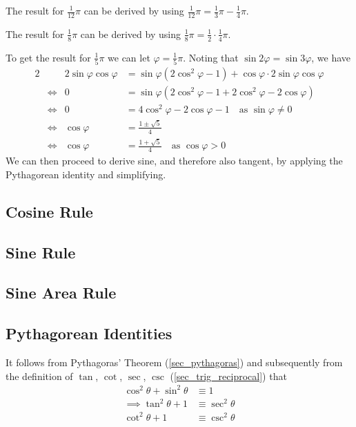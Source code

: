 The result for \(\frac 1{12} \pi\) can be derived by using
\(\frac 1{12} \pi = \frac 13 \pi - \frac 14 \pi\).

The result for \(\frac 18 \pi\) can be derived by using
\(\frac 18 \pi = \frac 12 \cdot \frac 14 \pi\).

To get the result for \(\frac 15 \pi\) we can let
\(\varphi = \frac 15 \pi\).  Noting that
\(\sin 2\varphi = \sin 3\varphi\), we have
\begin{alignat*}2
    && 2\sin \varphi \cos \varphi
        &= \sin \varphi (2\cos^2 \varphi - 1)
        + \cos \varphi \cdot 2\sin \varphi \cos \varphi \\
    &\iff{}& 0 &= \sin \varphi (2\cos^2 \varphi - 1
                            + 2\cos^2 \varphi - 2\cos \varphi) \\
    &\iff{}& 0 &= 4\cos^2 \varphi - 2\cos \varphi - 1
        \quad \text{as \(\sin \varphi \ne 0\)} \\
    &\iff{}& \cos \varphi &= \frac{1 \pm \sqrt 5} 4 \\
    &\iff{}& \cos \varphi &= \frac{1 + \sqrt 5} 4
        \quad \text{as \(\cos \varphi > 0\)}
\end{alignat*}
We can then proceed to derive sine, and therefore also tangent, by applying
the Pythagorean identity and simplifying.

\subsection{Cosine Rule}

\subsection{Sine Rule}

\subsection{Sine Area Rule}

\subsection{Pythagorean Identities} \label{sec_trig_pythag}

It follows from Pythagoras' Theorem (\ref{sec_pythagoras})
and subsequently from the definition of
\(\tan\), \(\cot\), \(\sec\), \(\csc\) (\ref{sec_trig_reciprocal}) that
\begin{align}
\cos^2 \theta + \sin^2 \theta &\equiv 1 \\
\implies \tan^2 \theta + 1 &\equiv \sec^2 \theta \\
\cot^2 \theta + 1 &\equiv \csc^2 \theta
\end{align}

